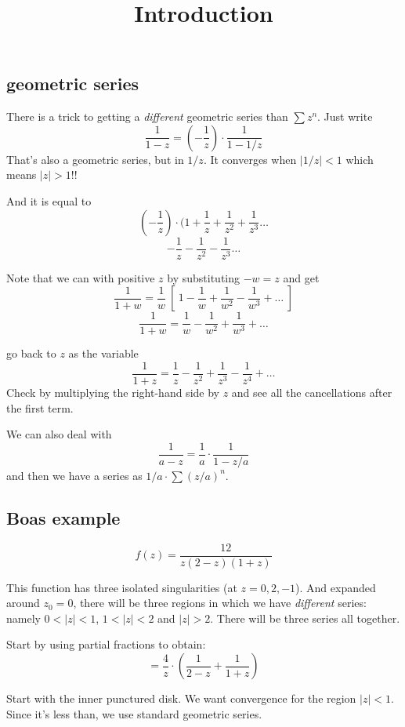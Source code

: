 \documentclass[11pt, oneside]{article}
\title{Introduction}
\date{}
\begin{document}
\maketitle
\Large


\subsection*{geometric series}

There is a trick to getting a \emph{different} geometric series than $\sum z^n$.  Just write
\[ \frac{1}{1 - z} = (-\frac{1}{z}) \cdot \frac{1}{1 - 1/z} \]
That's also a geometric series, but in $1/z$.  It converges when $|1/z| < 1$ which means $|z| > 1$!!  

And it is equal to
\[ (-\frac{1}{z}) \cdot (1 + \frac{1}{z} + \frac{1}{z^2} + \frac{1}{z^3} \dots \]
\[ - \frac{1}{z} - \frac{1}{z^2} - \frac{1}{z^3} \dots \]

Note that we can with positive $z$ by substituting $-w = z$ and get
\[ \frac{1}{1+w} =  \frac{1}{w} \ [ \ 1 - \frac{1}{w} + \frac{1}{w^2} - \frac{1}{w^3} + \dots \ ] \]
\[ \frac{1}{1+w} =  \frac{1}{w} - \frac{1}{w^2} + \frac{1}{w^3} + \dots \]

go back to $z$ as the variable
\[ \frac{1}{1+z} =  \frac{1}{z} - \frac{1}{z^2} + \frac{1}{z^3} - \frac{1}{z^4} + \dots \]
Check by multiplying the right-hand side by $z$ and see all the cancellations after the first term.

We can also deal with 
\[ \frac{1}{a - z} = \frac{1}{a} \cdot \frac{1}{1 - z/a} \]
and then we have a series as $1/a \cdot \sum (z/a)^n$.

\subsection*{Boas example}
\[ f(z) = \frac{12}{z(2 - z)(1 + z)} \]

This function has three isolated singularities (at $z = 0, 2, -1$). And expanded around $z_0 = 0$, there will be three regions in which we have \emph{different} series:  namely $0 < |z| < 1$, $1 < |z| < 2$ and $|z| > 2$.  There will be three series all together.

Start by using partial fractions to obtain:
\[ = \frac{4}{z} \cdot (\frac{1}{2 - z} + \frac{1}{1 + z}) \]

Start with the inner punctured disk.  We want convergence for the region $|z| < 1$.  Since it's less than, we use standard geometric series.
\end{document}
